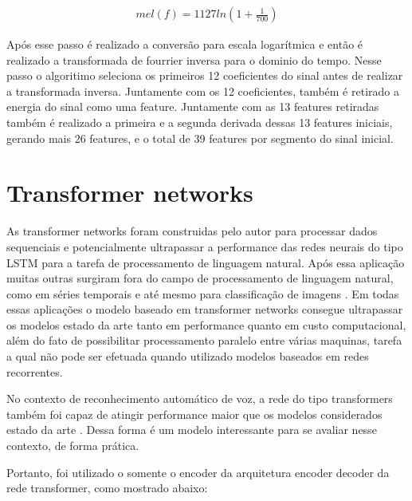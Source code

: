 \documentclass[
	12pt,				%
	openright,			%
	oneside,			%
	a4paper,			%
	chapter=TITLE,		%
	english,			%
	french,				%
	spanish,			%
	brazil				%
	]{abntex2}
\theoremstyle{definition}
\begin{document}
\begin{align}
	mel(f) = 1127ln(1+ \frac{1}{700})
\end{align}

Após esse passo  é realizado a conversão para escala logarítmica e então é realizado a transformada de fourrier inversa para o dominio do tempo. Nesse passo o algoritimo seleciona os primeiros 12 coeficientes do sinal antes de realizar a transformada inversa. Juntamente com os 12 coeficientes, também é retirado a energia do sinal como uma feature. Juntamente com as 13 features retiradas também é realizado a primeira e a segunda derivada dessas 13 features iniciais, gerando mais 26 features,  e o total de 39 features por segmento do sinal inicial.

\section{Transformer networks}
As transformer networks foram construidas pelo autor  para processar dados sequenciais e potencialmente ultrapassar a performance das redes neurais do tipo LSTM para a tarefa de processamento de linguagem natural. Após essa aplicação muitas outras surgiram fora do campo de processamento de linguagem natural, como em séries temporais   e até mesmo para classificação de imagens . Em todas essas aplicações o modelo baseado em transformer networks consegue ultrapassar os modelos estado da arte tanto em performance quanto em custo computacional, além do fato de possibilitar processamento paralelo entre várias maquinas, tarefa a qual não pode ser efetuada quando utilizado modelos baseados em redes recorrentes.

No contexto de reconhecimento automático de voz, a rede do tipo transformers também foi capaz de atingir performance maior que os modelos considerados estado da arte . Dessa forma é um modelo interessante para se avaliar nesse contexto, de forma prática.

Portanto, foi utilizado o somente o encoder da arquitetura encoder decoder da rede transformer, como mostrado abaixo:
\end{document}
